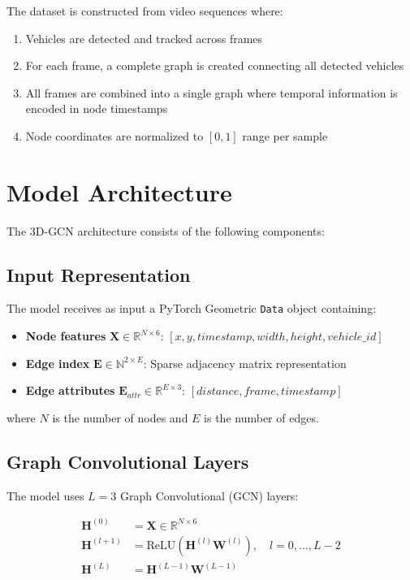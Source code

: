 \documentclass[11pt,a4paper]{article}
\begin{document}
The dataset is constructed from video sequences where:
\begin{enumerate}
    \item Vehicles are detected and tracked across frames
    \item For each frame, a complete graph is created connecting all detected vehicles
    \item All frames are combined into a single graph where temporal information is encoded in node timestamps
    \item Node coordinates are normalized to $[0, 1]$ range per sample
\end{enumerate}

\section{Model Architecture}

The 3D-GCN architecture consists of the following components:

\subsection{Input Representation}

The model receives as input a PyTorch Geometric \texttt{Data} object containing:
\begin{itemize}
    \item \textbf{Node features} $\mathbf{X} \in \mathbb{R}^{N \times 6}$: $[x, y, timestamp, width, height, vehicle\_id]$
    \item \textbf{Edge index} $\mathbf{E} \in \mathbb{N}^{2 \times E}$: Sparse adjacency matrix representation
    \item \textbf{Edge attributes} $\mathbf{E}_{attr} \in \mathbb{R}^{E \times 3}$: $[distance, frame, timestamp]$
\end{itemize}

where $N$ is the number of nodes and $E$ is the number of edges.

\subsection{Graph Convolutional Layers}

The model uses $L=3$ Graph Convolutional (GCN) layers:

\begin{align}
\mathbf{H}^{(0)} &= \mathbf{X} \in \mathbb{R}^{N \times 6} \\
\mathbf{H}^{(l+1)} &= \text{ReLU}\left(\mathbf{H}^{(l)} \mathbf{W}^{(l)}\right), \quad l = 0, \ldots, L-2 \\
\mathbf{H}^{(L)} &= \mathbf{H}^{(L-1)} \mathbf{W}^{(L-1)}
\end{align}
\end{document}
